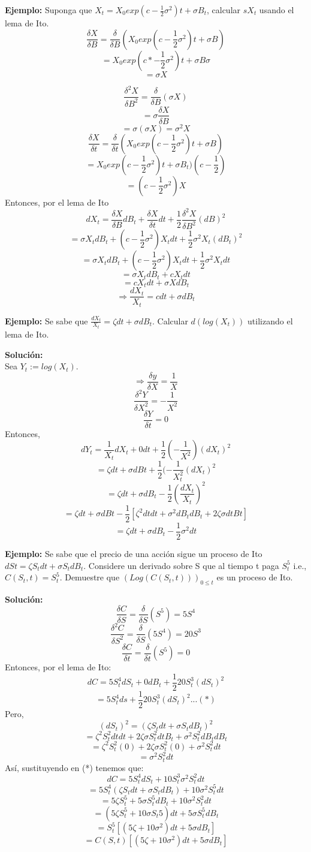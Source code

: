 \documentclass[12pts]{extarticle}
\begin{document}
\textbf{Ejemplo:} Suponga que $X_t=X_0 exp{(c-\frac{1}{2}\sigma^2)t +\sigma B_t}$, calcular $sX_t$ usando el lema de Ito. 
\\
$$\frac{\delta X}{\delta B}= \frac{\delta}{\delta B} (X_0 exp{(c-\frac{1}{2}\sigma^2)t +\sigma B})$$ $$=X_0 exp{(c*-\frac{1}{2}\sigma^2)t +\sigma B}\sigma$$ $$=\sigma X$$ 

$$\frac{\delta^2 X}{\delta B^2}= \frac{\delta}{\delta B}(\sigma X)$$ $$=\sigma \frac{\delta X}{\delta B}$$ $$ =\sigma (\sigma X)=\sigma^2 X$$
$$\frac{\delta X}{\delta t} =\frac{\delta}{\delta t} (X_0 exp{(c-\frac{1}{2}\sigma^2)t +\sigma B})$$ $$=X_0 exp{(c-\frac{1}{2}\sigma^2)t +\sigma B_t})(c-\frac{1}{2})$$ $$=(c-\frac{1}{2}\sigma^2)X$$
Entonces, por el lema de Ito
 $$ dX_t=\frac{\delta X}{\delta B} dB_t + \frac{\delta X}{\delta t} dt + \frac{1}{2} \frac{\delta^2 X}{\delta B^2} (dB)^2 $$
$$=\sigma X_t dB_t + (c-\frac{1}{2}\sigma^2)X_t dt+ \frac{1}{2}\sigma^2 X_t (dB_t)^2$$
$$=\sigma X_t dB_t + (c-\frac{1}{2}\sigma^2)X_t dt+ \frac{1}{2}\sigma^2 X_t dt$$
$$=\sigma X_t dB_t + cX_t dt$$
$$=cX_t dt +\sigma X dB_t$$
$$\Rightarrow \frac{dX_t}{X_t}=c dt + \sigma dB_t$$

\textbf{Ejemplo:} Se sabe que $\frac{d X_t}{X_t}=\zeta dt + \sigma dB_t$. Calcular $d(log(X_t))$ utilizando el lema de Ito.

\textbf{Solución:} \\
Sea $Y_t := log(X_t)$. \\
$$\Rightarrow  \frac{\delta y}{\delta X} = \frac{1}{X} $$ 
$$ \frac{\delta^2 Y}{\delta X^2}=-\frac{1}{X^2} $$
$$\frac{\delta Y}{\delta t}=0$$
Entonces, $$dY_t =\frac{1}{X_t}dX_t+0dt+\frac{1}{2}(-\frac{1}{X^2})(dX_t)^2$$
$$=\zeta dt +\sigma dBt +\frac{1}{2}(-\frac{1}{X_t^2}(dX_t)^2$$
$$=\zeta dt+ \sigma dB_t -\frac{1}{2}(\frac{dX_t}{X_t})^2$$
$$=\zeta dt +\sigma dBt - \frac{1}{2}[\zeta^2 dtdt + \sigma^2 dB_t dB_t+2\zeta \sigma dtBt]$$
$$=\zeta dt+\sigma dB_t-\frac{1}{2}\sigma^2 dt$$

\textbf{Ejemplo:} Se sabe que el precio de una acción sigue un proceso de Ito $dSt=\zeta S_t dt +\sigma S_t dB_t$. Considere un derivado sobre S que al tiempo t paga $S_t^5$ i.e., $C(S_t, t)=S_t^5$. Demuestre que $(Log(C(S_t, t)))_{0 \leq t}$ es un proceso de Ito. 

\textbf{Solución:} 
$$\frac{\delta C}{\delta S}=\frac{\delta}{\delta S}(S^5)=5S^4$$
$$\frac{\delta^2 C}{\delta S^2}=\frac{\delta}{\delta S}(5S^4)=20S^3$$
$$\frac{\delta C}{\delta t}=\frac{\delta}{\delta t}(S^5)=0$$
Entonces, por el lema de Ito:
$$dC=5S_t^4 dS_t +0dB_t +\frac{1}{2} 20S_t^3 (dS_t)^2$$
$$=5S_t^4 ds + \frac{1}{2}20S_t^3(dS_t)^2 ... (*)$$
Pero, $$(dS_t)^2=(\zeta S_t dt +\sigma S_t dB_t)^2$$
$$=\zeta^2 S_t^2 dt dt + 2\zeta \sigma S_t^2 dtB_t + \sigma ^2 S_t^2 dB_t dB_t$$
$$=\zeta^2 S_t^2 (0)+2\zeta \sigma S_t^2 (0) + \sigma^2 S_t^2 dt $$
$$=\sigma^2 S_t^2 dt$$
Así, sustituyendo en (*) tenemos que:
$$dC=5S_t^4 dS_t +10 S_t^3 \sigma^2 S_t^2 dt $$
$$=5S_t^4 (\zeta S_t dt + \sigma S_t dB_t)+10\sigma^2 S_t^5 dt $$
$$=5\zeta S_t^5 +5\sigma S_t^5 dB_t +10 \sigma^2 S_t^2 dt$$
$$=(5\zeta S_t^5 +10  \sigma S_t5)dt +5\sigma S_t^5 dB_t$$
$$=S_t^5[(5 \zeta +10 \sigma^2)dt +5\sigma dB_t]$$
$$=C(S,t)[(5\zeta +10 \sigma^2) dt + 5\sigma dB_t]$$ 
\end{document}

